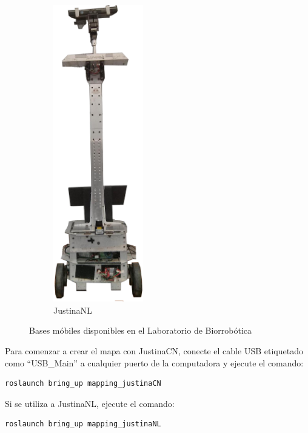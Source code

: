 \documentclass[letterpaper,12pt]{article}
\begin{document}
\begin{figure}
\begin{subfigure}{0.45\textwidth}
  \includegraphics[width=0.43\textwidth]{Figures/JustinaNL.jpg}
  \caption{JustinaNL}
  \label{fig:JustinaNL}
\end{subfigure}
\caption{Bases móbiles disponibles en el Laboratorio de Biorrobótica}
\end{figure}

Para comenzar a crear el mapa con JustinaCN, conecte el cable USB etiquetado como ``USB\_Main'' a cualquier puerto de la computadora y ejecute el comando:
\begin{verbatim}
roslaunch bring_up mapping_justinaCN
\end{verbatim}

Si se utiliza a JustinaNL, ejecute el comando:
\begin{verbatim}
roslaunch bring_up mapping_justinaNL
\end{verbatim}
\end{document}
